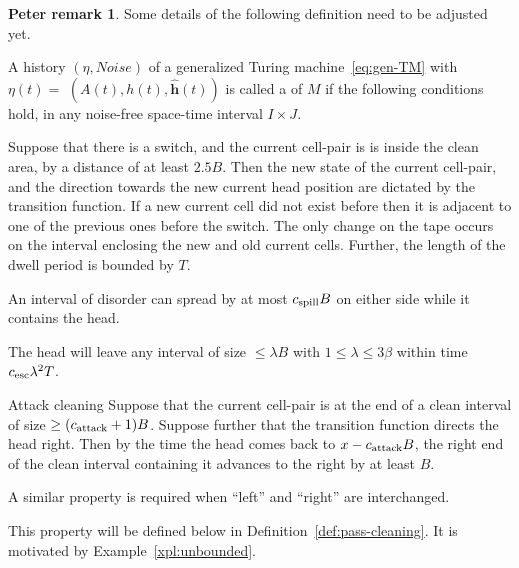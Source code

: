 \documentclass[11pt]{memoir}
\theoremstyle{definition} %
\newtheorem{Premark}{\color{cyan}Peter remark}
\newenvironment{premark}{\begin{Premark}\color{cyan}}{\varqed\end{Premark}}
\renewcommand{\le}{\leq}
\renewcommand{\ge}{\geq}
\renewcommand{\vek}[1]{\mathbf{#1}}
\def\B{B}
\newcommand{\h}{h}
\newcommand{\vhc}{\vek{\hat h}}
\newcommand{\Noise}{\mathit{Noise}}
\newcommand{\Tu}{T}
\newcommand{\cns}[1]{c_{\textrm{\upshape #1}}}
\newcommand{\CAtt}{\cns{attack}}
\newcommand{\CEsc}{\cns{esc}}
\newcommand{\CSpill}{\cns{spill}}
\begin{document}
\begin{premark}
  Some details of the following definition need to be adjusted yet.
\end{premark}


\begin{definition}[Trajectory]\label{def:traj}
\begin{sloppypar}
   A history  \( (\eta, \Noise) \) of a generalized Turing 
machine~\eqref{eq:gen-TM} with \(\eta(t) =\)
\( (A(t), \h(t), \vhc(t)) \)
is called a  of \( M \) if the following conditions hold, in any 
noise-free space-time interval \( I\times J \).
  \end{sloppypar}
\begin{description}

\item[Transition Function]\label{i:def.traj.transition}
Suppose that there is a switch, and the current cell-pair is 
is inside the clean area, by a distance of at least \( 2.5\B \).
Then the new state of the current cell-pair, and
the direction towards the new current head position
are dictated by the transition function.
If a new current cell did not exist before then it is adjacent to one of the
previous ones before the switch.
The only change on the tape occurs on the interval enclosing the new and old current cells.
Further, the length of the dwell period is bounded by \( \Tu \).

\item[Spill Bound]\label{i:spill-bound}
  An interval of disorder can spread by at most \( \CSpill \B \)
  on either side while it contains the head.

\item[Escape] \label{i:def.traj.escape}
  The head will leave any interval of size \( \le \lambda\B \) with \( 1\le\lambda\le 3\beta \)
  within time \( \CEsc\lambda^{2}\Tu \).

\begin{sloppypar}
\item[Attack cleaning] \label{i:def.traj.attack-cleaning}
Suppose that the current cell-pair is at the end of a clean interval of size
\( \ge (\CAtt+1)\B \).
Suppose further that the transition function directs the head right.
Then by the time the head comes back to \( x-\CAtt \B \), the right end of the clean interval containing it
advances to the right by at least \( \B \).
 \end{sloppypar}

A similar property is required when ``left'' and ``right'' are interchanged.

\item[Pass Cleaning] This property will be defined below in Definition~\ref{def:pass-cleaning}.
It is motivated by Example~\ref{xpl:unbounded}.

\end{description}

\end{definition}
\end{document}
